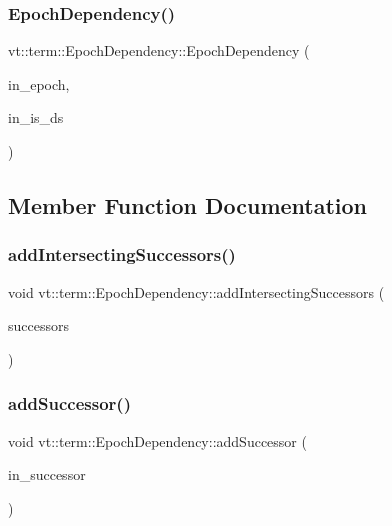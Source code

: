 \subsubsection{\texorpdfstring{Epoch\+Dependency()}{EpochDependency()}}
{\footnotesize\ttfamily vt\+::term\+::\+Epoch\+Dependency\+::\+Epoch\+Dependency (\begin{DoxyParamCaption}\item[{\hyperlink{namespacevt_a81d11b28122d43bf9834577e4a06440f}{Epoch\+Type}}]{in\+\_\+epoch,  }\item[{bool}]{in\+\_\+is\+\_\+ds }\end{DoxyParamCaption})\hspace{0.3cm}{\ttfamily [inline]}}



\subsection{Member Function Documentation}
\mbox{\label{structvt_1_1term_1_1_epoch_dependency_a7d50611404480b051f1ec7a6a0b008fb}} 
\subsubsection{\texorpdfstring{add\+Intersecting\+Successors()}{addIntersectingSuccessors()}}
{\footnotesize\ttfamily void vt\+::term\+::\+Epoch\+Dependency\+::add\+Intersecting\+Successors (\begin{DoxyParamCaption}\item[{\hyperlink{structvt_1_1term_1_1_epoch_dependency_a3f00b47c33158f3241ebbeb0a0cb7b1d}{Successor\+Bag\+Type}}]{successors }\end{DoxyParamCaption})}

\mbox{\label{structvt_1_1term_1_1_epoch_dependency_a326947de4ac73460b8779d8837040429}} 
\subsubsection{\texorpdfstring{add\+Successor()}{addSuccessor()}}
{\footnotesize\ttfamily void vt\+::term\+::\+Epoch\+Dependency\+::add\+Successor (\begin{DoxyParamCaption}\item[{\hyperlink{namespacevt_a81d11b28122d43bf9834577e4a06440f}{Epoch\+Type} const}]{in\+\_\+successor }\end{DoxyParamCaption})}

